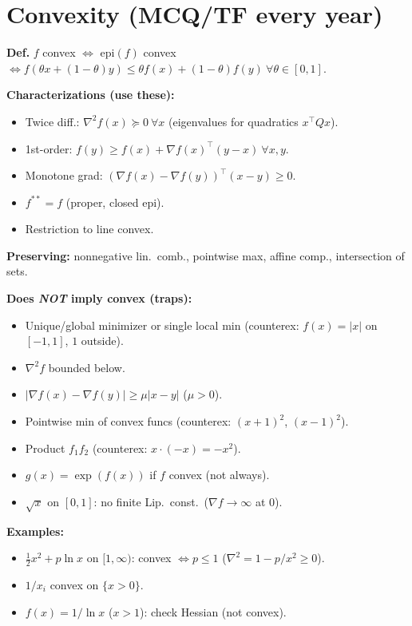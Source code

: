 
\section*{Convexity (MCQ/TF every year)}
\textbf{Def.} \(f\) convex \(\iff\) epi\((f)\) convex \(\iff f(\theta
x+(1-\theta)y)\le\theta f(x)+(1-\theta)f(y)\ \forall\theta\in[0,1]\).

\textbf{Characterizations (use these):}
\begin{itemize}
  \item Twice diff.: \(\nabla^2 f(x)\succeq0\ \forall x\)
    (eigenvalues for quadratics \(x^\top Qx\)).
  \item 1st-order: \(f(y)\ge f(x)+\nabla f(x)^\top(y-x)\ \forall x,y\).
  \item Monotone grad: \((\nabla f(x)-\nabla f(y))^\top(x-y)\ge0\).
  \item \(f^{**}=f\) (proper, closed epi).
  \item Restriction to line convex.
\end{itemize}

\textbf{Preserving:} nonnegative lin.\ comb., pointwise max, affine
comp., intersection of sets.

\textbf{Does \emph{NOT} imply convex (traps):}
\begin{itemize}
  \item Unique/global minimizer or single local min (counterex:
    \(f(x)=|x|\) on \([-1,1]\), \(1\) outside).
  \item \(\nabla^2 f\) bounded below.
  \item \(|\nabla f(x)-\nabla f(y)|\ge\mu|x-y|\) (\(\mu>0\)).
  \item Pointwise min of convex funcs (counterex: \((x+1)^2\), \((x-1)^2\)).
  \item Product \(f_1 f_2\) (counterex: \(x\cdot(-x)=-x^2\)).
  \item \(g(x)=\exp(f(x))\) if \(f\) convex (not always).
  \item \(\sqrt{x}\) on \([0,1]\): no finite Lip.\ const.\ (\(\nabla
    f\to\infty\) at 0).
\end{itemize}

\textbf{Examples:}
\begin{itemize}
  \item \(\frac12 x^2 + p\ln x\) on \([1,\infty)\): convex \(\iff
    p\le1\) (\(\nabla^2=1-p/x^2\ge0\)).
  \item \(1/x_i\) convex on \(\{x>0\}\).
  \item \(f(x)=1/\ln x\) (\(x>1\)): check Hessian (not convex).
\end{itemize}


